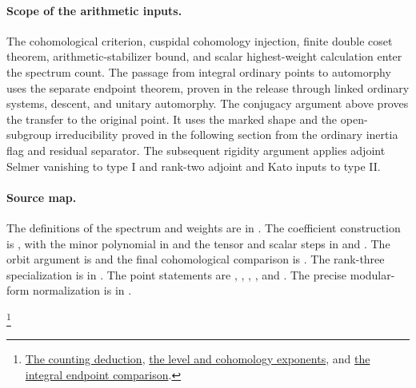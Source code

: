 \paragraph{Scope of the arithmetic inputs.}
The cohomological criterion, cuspidal cohomology injection, finite
double coset theorem, arithmetic-stabilizer bound, and scalar
highest-weight calculation enter the spectrum count. The passage from
integral ordinary points to automorphy uses the separate endpoint
theorem, proven in the release through linked ordinary systems,
descent, and unitary automorphy. The conjugacy argument above proves
the transfer to the original point. It uses the marked shape and the open-subgroup irreducibility proved
in the following section from the ordinary inertia flag and residual
separator. The subsequent
rigidity argument applies adjoint Selmer vanishing to type I and
rank-two adjoint and Kato inputs to type II.

\paragraph{Source map.}
The definitions of the spectrum and weights are in
. The coefficient construction is
, with the minor polynomial in  and the
tensor and scalar steps in  and .
The orbit argument is 
and the final cohomological comparison is . The
rank-three specialization is in
.
The point statements are ,
,
, , and
. The precise modular-form
normalization is in .

\footnote{\href{https://github.com/Deicyde/riemann-hypothesis/blob/40e56bab026552e089d7afcfeff08d2defb9c005/src/Development/AutomorphicArithmetic/AutomorphicVarieties/ModularityArgument/ThresholdArguments/DenseThresholdCases/TCardK.lean}{The counting deduction},
\href{https://github.com/Deicyde/riemann-hypothesis/blob/40e56bab026552e089d7afcfeff08d2defb9c005/src/Development/AutomorphicArithmetic/AutomorphicVarieties/AutomorphicForms/TemperedLocalComponents/CohBoundFree.lean}{the level and cohomology exponents}, and
\href{https://github.com/Deicyde/riemann-hypothesis/blob/40e56bab026552e089d7afcfeff08d2defb9c005/src/Development/AutomorphicArithmetic/AutomorphicVarieties/ModularityArgument/ThresholdArguments/DenseThresholdCases/AutomorphyU3OfEndoscopy.lean}{the integral endpoint comparison}.}
